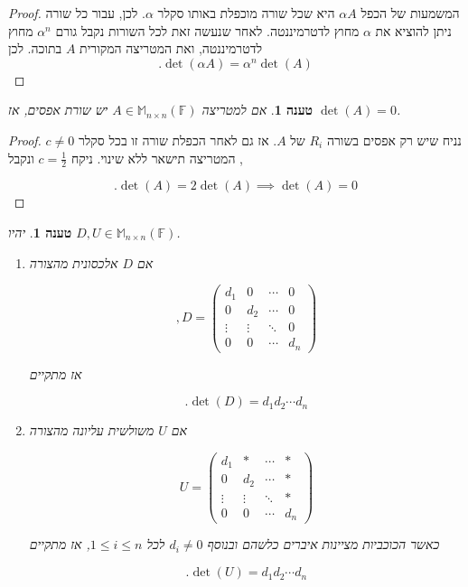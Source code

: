 \documentclass[12pt]{report}
\theoremstyle{plain}
\newtheorem{proposition}[theorem]{טענה}
\theoremstyle{definition}
\newcommand{\F}{\mathbb{F}}
\newcommand{\M}{\mathbb{M}}
\newcommand{\0}{\mathbf{0}}
\begin{document}
\begin{proof}
המשמעות של הכפל
$\alpha A$
היא שכל שורה מוכפלת באותו סקלר
$\alpha$.
לכן, עבור כל שורה ניתן להוציא את
$\alpha$
מחוץ לדטרמיננטה. לאחר שנעשה זאת לכל השורות נקבל גורם 
$\alpha^n$
מחוץ לדטרמיננטה, ואת המטריצה המקורית
$A$
בתוכה. לכן
$$
.\det(\alpha A)=\alpha^n\det(A)
$$
\end{proof}

\begin{proposition}\label{prop:zero-row}
אם למטריצה
$A\in\M_{n\times n}(\F)$
יש שורת אפסים,
אז
$\det(A)=0$.
\end{proposition}

\begin{proof}
נניח שיש רק אפסים בשורה
$R_i$
של
$A$.
אז גם לאחר הכפלת שורה זו בכל סקלר 
$c\neq 0$,
המטריצה תישאר ללא שינוי. ניקח
$c=\frac{1}{2}$
ונקבל

$$
.\det(A)=2\det(A) \implies \det(A)=0
$$
\end{proof}

\begin{proposition}\label{prop:diagonal-det}
יהיו
$D,U\in\M_{n\times n}(\F)$.

\begin{enumerate}[label=\alph*.]
\item 
אם
$D$
אלכסונית מהצורה

$$
,D=\begin{pmatrix}
d_1 &0 & \cdots & 0 \\
0 & d_2 & \cdots & 0 \\
\vdots & \vdots & \ddots & 0 \\
0 & 0 & \cdots & d_n
\end{pmatrix}
$$

אז מתקיים

$$
.\det(D)=d_1d_2\cdots d_n
$$


\item
אם
$U$
משולשית עליונה מהצורה

$$
U=\begin{pmatrix}
d_1 &* & \cdots & * \\
0 & d_2 & \cdots & * \\
\vdots & \vdots & \ddots & * \\
0 & 0 & \cdots & d_n
\end{pmatrix}
$$

כאשר הכוכביות מציינות איברים כלשהם ובנוסף
$d_i\neq 0$
לכל 
$1\leq i\leq n$,
אז מתקיים

$$
.\det(U)=d_1d_2\cdots d_n
$$


\end{enumerate}
\end{proposition}
\end{document}
